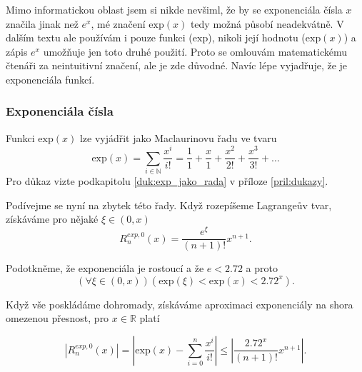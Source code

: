 \begin{remark}
Mimo informatickou oblast jsem si nikde nevšiml, že by se exponenciála čísla $x$ značila jinak než $e^x$, mé značení $\mathrm{exp}(x)$ tedy možná působí neadekvátně. V dalším textu ale používám i pouze funkci ($\mathrm{exp}$), nikoli její hodnotu ($\mathrm{exp}(x)$) a zápis $e^x$ umožňuje jen toto druhé použití. Proto se omlouvám matematickému čtenáři za neintuitivní značení, ale je zde důvodné. Navíc lépe vyjadřuje, že je exponenciála funkcí.
\end{remark}

\subsubsection{Exponenciála čísla}

\begin{fact}\label{vet:exp_jako_rada}
Funkci $\mathrm{exp}(x)$ lze vyjádřit jako Maclaurinovu řadu ve tvaru
\begin{equation}
\mathrm{exp}(x) = \underset{i \in \mathbb{N}}{\sum} \frac{x^i}{i!} = \frac{1}{1} + \frac{x}{1} + \frac{x^2}{2!} + \frac{x^3}{3!} + \ldots
\end{equation}
Pro důkaz vizte podkapitolu \ref{duk:exp_jako_rada} v příloze \ref{pril:dukazy}.
\end{fact}

Podívejme se nyní na zbytek této řady. Když rozepíšeme Lagrangeův tvar, získáváme pro nějaké $\xi\in(0,x)$
\begin{equation}
R_n^{exp, 0}(x) = \frac{e^\xi}{(n+1)!}x^{n+1}.
\end{equation}

Podotkněme, že exponenciála je rostoucí a že $e<2.72$ a proto
\begin{equation}
(\forall\xi\in (0,x))(\mathrm{exp}(\xi)<\mathrm{exp}(x) < 2.72^x).
\end{equation}

Když vše poskládáme dohromady, získáváme aproximaci exponenciály na shora omezenou přesnost, pro $x\in\mathbb{R}$ platí
\begin{fact}
\begin{equation}
|R_n^{exp, 0}(x)| = \left|\mathrm{exp}(x)- \sum_{i=0}^n \frac{x^i}{i!}\right| \leq \left| \frac{2.72^x}{(n+1)!}x^{n+1} \right|.
\end{equation}
\end{fact}

